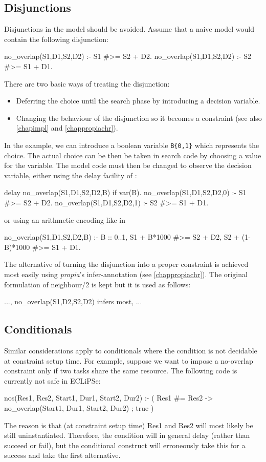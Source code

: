 \subsection{Disjunctions}

Disjunctions in the model should be avoided. Assume that a naive
model would contain the following disjunction:
\begin{code}
no_overlap(S1,D1,S2,D2) :- S1 #>= S2 + D2.
no_overlap(S1,D1,S2,D2) :- S2 #>= S1 + D1.
\end{code}
There are two basic ways of treating the disjunction:
\begin{itemize}
\item Deferring the choice until the search phase by introducing a
        decision variable.
\item Changing the behaviour of the disjunction so it becomes a constraint
        (see also \ref{chapimpl} and \ref{chappropiachr}).
\end{itemize}
In the example, we can introduce a boolean variable \verb.B{0,1}. which represents
the choice.
The actual choice can be then be taken in search code by choosing a
value for the variable. The model code must then be changed to observe
the decision variable, either using the delay facility of \eclipse{}:
\begin{code}
delay no_overlap(S1,D1,S2,D2,B) if var(B).
no_overlap(S1,D1,S2,D2,0) :- S1 #>= S2 + D2.
no_overlap(S1,D1,S2,D2,1) :- S2 #>= S1 + D1.
\end{code}
or using an arithmetic encoding like in
\begin{code}
no_overlap(S1,D1,S2,D2,B) :-
        B :: 0..1, 
        S1 +     B*1000 #>= S2 + D2,
        S2 + (1-B)*1000 #>= S1 + D1.
\end{code}
The alternative of turning the disjunction into a proper constraint is
achieved most easily using {\em propia}'s infer-annotation
(see \ref{chappropiachr}). The original formulation of neighbour/2
is kept but it is used as follows:
\begin{code}
    ..., no_overlap(S1,D2,S2,D2) infers most, ...
\end{code}


\subsection{Conditionals}

Similar considerations apply to conditionals where the condition is not
decidable at constraint setup time. For example, suppose we want to
impose a no-overlap constraint only if two tasks share the same resource.
The following code is currently not safe in ECLiPSe:
\begin{code}
nos(Res1, Res2, Start1, Dur1, Start2, Dur2) :-
    ( Res1 #= Res2 ->           %
        no_overlap(Start1, Dur1, Start2, Dur2)
    ;
        true
    )
\end{code}
The reason is that (at constraint setup time) Res1 and Res2 will most
likely be still uninstantiated. Therefore, the condition will in general
delay (rather than succeed or fail), but the conditional construct
will erroneously take this for a success and take the first alternative.

